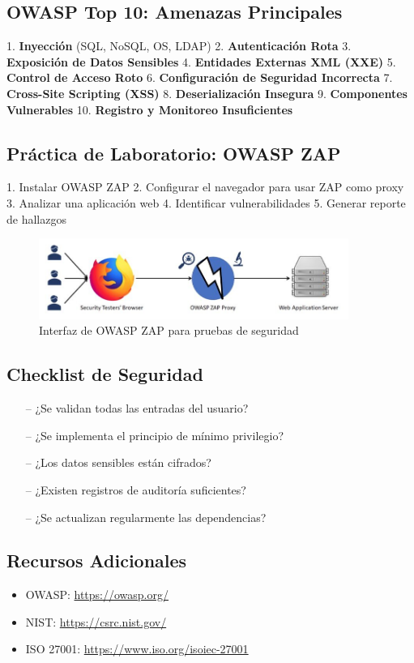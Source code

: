 \documentclass[12pt,a4paper]{article}
\begin{document}
\subsection{OWASP Top 10: Amenazas Principales}
1. \textbf{Inyección} (SQL, NoSQL, OS, LDAP)
2. \textbf{Autenticación Rota}
3. \textbf{Exposición de Datos Sensibles}
4. \textbf{Entidades Externas XML (XXE)}
5. \textbf{Control de Acceso Roto}
6. \textbf{Configuración de Seguridad Incorrecta}
7. \textbf{Cross-Site Scripting (XSS)}
8. \textbf{Deserialización Insegura}
9. \textbf{Componentes Vulnerables}
10. \textbf{Registro y Monitoreo Insuficientes}

\subsection{Práctica de Laboratorio: OWASP ZAP}
1. Instalar OWASP ZAP
2. Configurar el navegador para usar ZAP como proxy
3. Analizar una aplicación web
4. Identificar vulnerabilidades
5. Generar reporte de hallazgos

\begin{figure}[H]
\centering
\includegraphics[width=0.9\textwidth]{owasp_zap.png}
\caption{Interfaz de OWASP ZAP para pruebas de seguridad}
\label{fig:owasp_zap}
\end{figure}

\subsection{Checklist de Seguridad}
\begin{itemize}
    \item[--] ¿Se validan todas las entradas del usuario?
    \item[--] ¿Se implementa el principio de mínimo privilegio?
    \item[--] ¿Los datos sensibles están cifrados?
    \item[--] ¿Existen registros de auditoría suficientes?
    \item[--] ¿Se actualizan regularmente las dependencias?
\end{itemize}

\subsection{Recursos Adicionales}
\begin{itemize}
    \item OWASP: \url{https://owasp.org/}
    \item NIST: \url{https://csrc.nist.gov/}
    \item ISO 27001: \url{https://www.iso.org/isoiec-27001}
\end{itemize}
\end{document}
